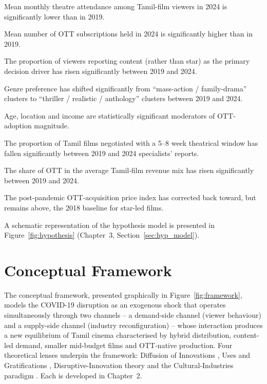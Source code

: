 \begin{description}[style=nextline,leftmargin=2.6em]
\item[H1.] Mean monthly theatre attendance among Tamil-film viewers
           in 2024 is significantly lower than in 2019.
\item[H2.] Mean number of OTT subscriptions held in 2024 is
           significantly higher than in 2019.
\item[H3.] The proportion of viewers reporting content (rather than
           star) as the primary decision driver has risen
           significantly between 2019 and 2024.
\item[H4.] Genre preference has shifted significantly from
           ``mass-action / family-drama'' clusters to ``thriller /
           realistic / anthology'' clusters between 2019 and 2024.
\item[H5.] Age, location and income are statistically significant
           moderators of OTT-adoption magnitude.
\item[H6.] The proportion of Tamil films negotiated with a 5--8 week
           theatrical window has fallen significantly between 2019
           and 2024 specialists' reports.
\item[H7.] The share of OTT in the average Tamil-film revenue mix
           has risen significantly between 2019 and 2024.
\item[H8.] The post-pandemic OTT-acquisition price index has
           corrected back toward, but remains above, the 2018
           baseline for star-led films.
\end{description}

\noindent
A schematic representation of the hypothesis model is presented in
Figure~\ref{fig:hypothesis} (Chapter~3, Section~\ref{sec:hyp_model}).

\section{Conceptual Framework}
\label{sec:framework}

The conceptual framework, presented graphically in
Figure~\ref{fig:framework}, models the COVID-19 disruption as an
exogenous shock that operates simultaneously through two channels --
a demand-side channel (viewer behaviour) and a supply-side channel
(industry reconfiguration) -- whose interaction produces a new
equilibrium of Tamil cinema characterised by hybrid distribution,
content-led demand, smaller mid-budget films and OTT-native
production.  Four theoretical lenses underpin the framework:
Diffusion of Innovations \citep{rogers2003}, Uses and Gratifications
\citep{katz1973,sundar2013}, Disruptive-Innovation theory
\citep{christensen1997} and the Cultural-Industries paradigm
\citep{hesmondhalgh2019}.  Each is developed in Chapter~2.

